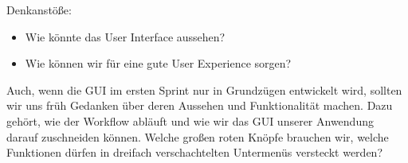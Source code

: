 Denkanstöße:
\begin{itemize}
\item Wie könnte das User Interface aussehen?
\item Wie können wir für eine gute User Experience sorgen?
\end{itemize}
Auch, wenn die GUI im ersten Sprint nur in Grundzügen entwickelt wird, sollten wir uns früh Gedanken über deren Aussehen und Funktionalität machen. Dazu gehört, wie der Workflow abläuft und wie wir das GUI unserer Anwendung darauf zuschneiden können. Welche großen roten Knöpfe brauchen wir, welche Funktionen dürfen in dreifach verschachtelten Untermenüs versteckt werden?
\nsecend